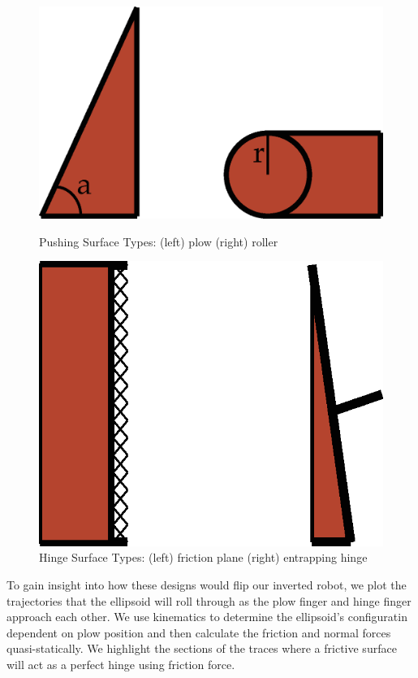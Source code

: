 \documentclass[runningheads,a4paper]{llncs}
\begin{document}
\begin{figure}[!tbp]
  \centering
  \begin{minipage}[b]{0.4\textwidth}
    \includegraphics[width=1.0\textwidth]{PlowSurfaceTypes.eps}
    \caption{\label{fig:psurfaces}Pushing Surface Types: (left) plow (right) roller}
  \end{minipage}
  \hfill
  \begin{minipage}[b]{0.4\textwidth}
    \includegraphics[width=1.0\textwidth]{HingeSurfaceTypes.eps}
    \caption{\label{fig:surfacesh}Hinge Surface Types: (left) friction plane (right) entrapping hinge}
  \end{minipage}
\end{figure}

To gain insight into how these designs would flip our inverted robot, we plot the trajectories that the ellipsoid will roll through as the plow finger and hinge finger approach each other.
We use kinematics to determine the ellipsoid's configuratin dependent on plow position and then calculate the friction and normal forces quasi-statically.
We highlight the sections of the traces where a frictive surface will act as a perfect hinge using friction force.
\end{document}
